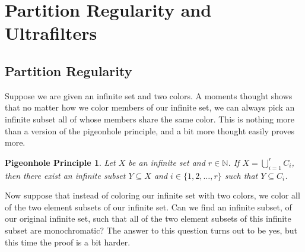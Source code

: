 \documentclass[12pt]{article}
\theoremstyle{plain}
\newtheorem*{php}{Pigeonhole Principle}
\begin{document}
\section{Partition Regularity and Ultrafilters}

\newcommand{\la}{\langle}
\newcommand{\ra}{\rangle}

\newcommand{\bbN}{\mathbb{N}}

\subsection{Partition Regularity}
Suppose we are given an infinite set and two colors.
A moments thought shows that no matter how we color members of our
infinite set, we can always pick an infinite subset all of whose
members share the same color.
This is nothing more than a version of the pigeonhole principle, and a
bit more thought easily proves more.

\begin{php}
  Let $X$ be an infinite set and $r \in \bbN$.
  If $X = \bigcup_{i=1}^r C_i$, then there exist an infinite subset $Y
  \subseteq X$ and $i \in \{1, 2, \ldots, r\}$ such that $Y \subseteq
  C_i$.
\end{php}

Now suppose that instead of coloring our infinite set with two colors,
we color all of the two element subsets of our infinite set. 
Can we find an infinite subset, of our original infinite set, such
that all of the two element subsets of this infinite subset are
monochromatic?
The answer to this question turns out to be yes, but this time the
proof is a bit harder.
\end{document}
